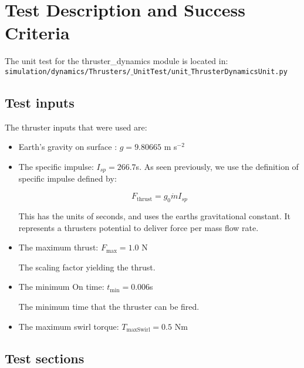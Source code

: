 \section{Test Description and Success Criteria}

The unit test for the thruster\_dynamics module is located in:\\

\noindent
{\tt simulation/dynamics/Thrusters/$\_$UnitTest/unit$\_$ThrusterDynamicsUnit.py} \\

\subsection{Test inputs}

The thruster inputs that were used are:

\begin{itemize}
\item Earth's gravity on surface : $g=9.80665$ m s$^{-2}$ 
\item The specific impulse: $I_{sp} = 266.7$s. As seen previously, we use the definition of specific impulse defined by:

\begin{equation*}
F_{\mathrm{thrust}} = g_0 \dot{m} I_{sp}
\end{equation*}

This has the units of seconds, and uses the earths gravitational constant. It represents a thrusters potential to deliver force per mass flow rate. 
\item The maximum thrust: $F_{\mathrm{max}} = 1.0$ N

The scaling factor yielding the thrust.
\item The minimum On time: $t_{\mathrm{min}} = 0.006$s

The minimum time that the thruster can be fired.

\item The maximum swirl torque: $T_{\mathrm{maxSwirl}} = 0.5$ Nm
\end{itemize}

\subsection{Test sections}

